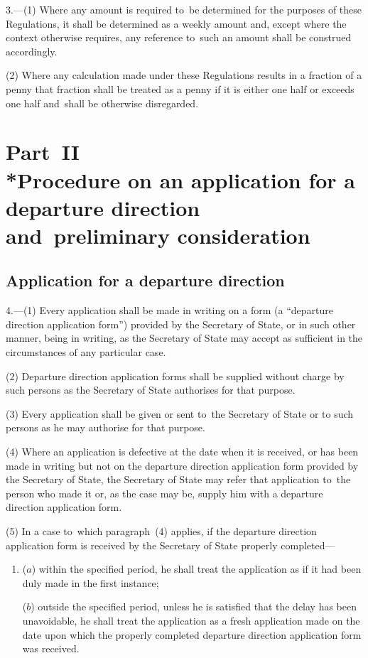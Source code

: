 \documentclass[12pt,a4paper]{article}
\begin{document}
3.—(1) Where any amount is required to~be determined for
the purposes of these Regulations, it shall be determined as a weekly amount
and, except where the context otherwise requires, any reference to~such an
amount shall be construed accordingly.

(2) Where any calculation made under these Regulations results in a fraction of
a penny that fraction shall be treated as a penny if it is either one half or
exceeds one half and~shall be otherwise disregarded.

\section[Part~II --- Procedure on an application for a departure direction and~preliminary consideration]{Part~II\\*Procedure on an application for a departure direction and~preliminary consideration}

\renewcommand\parthead{--- Part~II}

\subsection[4. Application for a departure direction]{Application for a departure direction}

4.—(1) Every application shall
be made in writing on a form (a “departure direction application form”) provided
by the Secretary of State, or in such other manner, being in writing, as the
Secretary of State may accept as sufficient in the circumstances of any
particular case.

(2) Departure direction application forms shall be supplied without charge by
such persons as the Secretary of State authorises for that purpose.

(3) Every application shall be given or sent to~the Secretary of State or to
such persons as he may authorise for that purpose.

(4) Where an application is defective at the date when it is received, or has
been made in writing but not on the departure direction application form
provided by the Secretary of State, the Secretary of State may refer that
application to~the person who made it or, as the case may be, supply him with a
departure direction application form.

(5) In a case to~which paragraph~(4) applies, if the departure direction
application form is received by the Secretary of State properly completed—
\begin{enumerate}\item[]
($a$) within the specified period, he shall treat the application as if it had been
duly made in the first instance;

($b$) outside the specified period, unless he is satisfied that the delay has been
unavoidable, he shall treat the application as a fresh application made on the
date upon which the properly completed departure direction application form was
received.
\end{enumerate}
\end{document}
